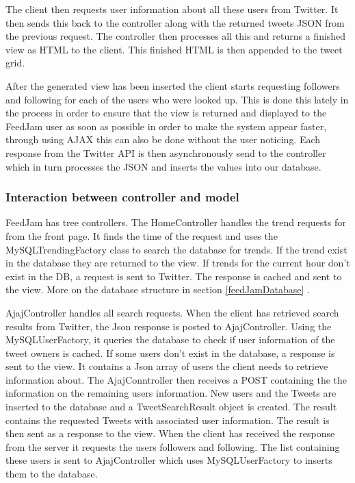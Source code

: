 The client then requests user information about all these users from Twitter. It then sends this back to the controller along with the returned tweets JSON from the previous request. The controller then processes all this and returns a finished view as HTML to the client. This finished HTML is then appended to the tweet grid.

After the generated view has been inserted the client starts requesting followers and following for each of the users who were looked up. This is done this lately in the process in order to ensure that the view is returned and displayed to the FeedJam user as soon as possible in order to make the system appear faster, through using AJAX this can also be done without the user noticing. Each response from the Twitter API is then asynchronously send to the controller which in turn processes the JSON and inserts the values into our database.

\subsubsection{Interaction between controller and model} %
FeedJam has tree controllers. The HomeController handles the trend requests for from the front page. It finds the time of the request and uses the MySQLTrendingFactory class to search the database for trends. If the trend exist in the database they are returned to the view. If trends for the current hour don't exist in the DB, a request is sent to Twitter. The response is cached and sent to the view. More on the database structure in section \ref{feedJamDatabase} .

AjajController handles all search requests. When the client has retrieved search results from Twitter, the Json response is posted to AjajController. Using the MySQLUserFactory, it queries the database to check if user information of the tweet owners is cached. If some users don't exist in the database, a response is sent to the view. It contains a Json array of users the client needs to retrieve information about. 
The AjajConntroller then receives a POST containing the the information on the remaining users information. New users and the Tweets are inserted to the database and a TweetSearchResult object is created. The result contains the requested Tweets with associated user information. The result is then sent as a response to the view. When the client has received the response from the server it requests the users followers and following. The list containing these users is sent to AjajController which uses MySQLUserFactory to inserts them to the database. 

